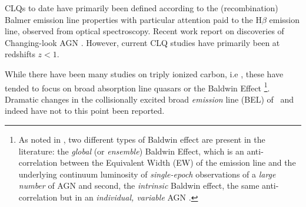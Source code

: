 \documentclass[a4paper,fleqn,usenatbib]{mnras}
\begin{document}
CLQs to date have primarily been defined according to the
(recombination) Balmer emission line properties with particular
attention paid to the H$\beta$ emission line, observed from optical
spectroscopy. Recent work report on discoveries of \mgii Changing-look
AGN \citep{Guo2019, Homan2019}. However, current CLQ studies have
primarily been at redshifts $z<1$.

While there have been many studies on triply ionized carbon, i.e
\civ, these have tended to focus on broad absorption line quasars
\citep[BAL QSOs; see Table 1 of][]{Hemler2019} or the Baldwin Effect
\citep[BEff; ][]{Baldwin1977, Bian2012, Jensen2016,
Hamann2017}\footnote{As noted in \citet{Rakic2017}, two different
types of Baldwin effect are present in the literature: the {\it
global} (or {\it ensemble}) Baldwin Effect, which is an
anti-correlation between the Equivalent Width (EW) of the emission line and the
underlying continuum luminosity of {\it single-epoch} observations of
a {\it large number} of AGN and second, the {\it intrinsic} Baldwin
effect, the same anti-correlation but in an {\it individual, variable}
AGN \citep{PoggePeterson1992}.}.  Dramatic changes in the
collisionally excited broad {\it emission} line (BEL) of \civ\ and
indeed \ciii have not to this point been reported.
\end{document}

